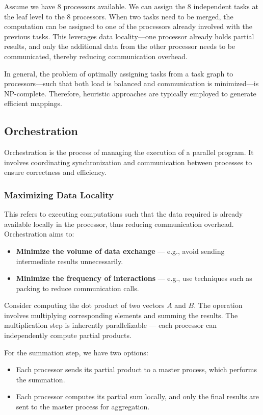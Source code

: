 \documentclass[12pt]{book}
\begin{document}
Assume we have 8 processors available. We can assign the 8 independent tasks at the leaf level to the 8 processors. When two tasks need to be merged, the computation can be assigned to one of the processors already involved with the previous tasks. This leverages data locality—one processor already holds partial results, and only the additional data from the other processor needs to be communicated, thereby reducing communication overhead.

In general, the problem of optimally assigning tasks from a task graph to processors—such that both load is balanced and communication is minimized—is NP-complete. Therefore, heuristic approaches are typically employed to generate efficient mappings.

\subsection{Orchestration}
Orchestration is the process of managing the execution of a parallel program. It involves coordinating synchronization and communication between processes to ensure correctness and efficiency.

\subsubsection{Maximizing Data Locality}
This refers to executing computations such that the data required is already available locally in the processor, thus reducing communication overhead. Orchestration aims to:
\begin{itemize}
    \item \textbf{Minimize the volume of data exchange} — e.g., avoid sending intermediate results unnecessarily.
    \item \textbf{Minimize the frequency of interactions} — e.g., use techniques such as packing to reduce communication calls.
\end{itemize}

Consider computing the dot product of two vectors $A$ and $B$. The operation involves multiplying corresponding elements and summing the results. The multiplication step is inherently parallelizable — each processor can independently compute partial products. 

For the summation step, we have two options:
\begin{itemize}
    \item Each processor sends its partial product to a master process, which performs the summation.
    \item Each processor computes its partial sum locally, and only the final results are sent to the master process for aggregation.
\end{itemize}
\end{document}
